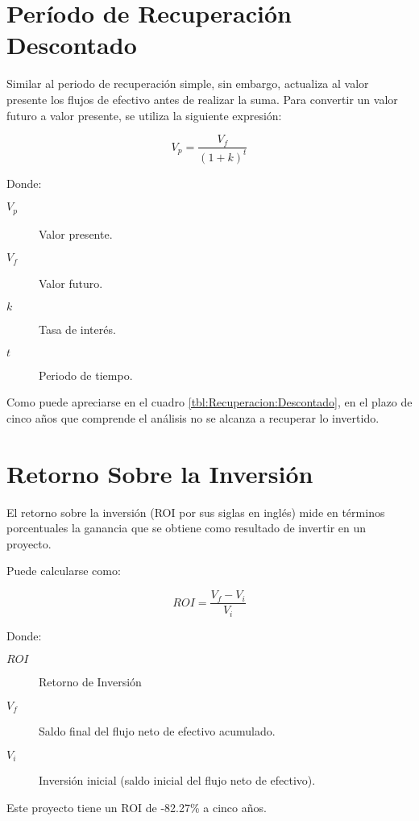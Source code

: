 

\section{Período de Recuperación Descontado}

Similar al periodo de recuperación simple, sin embargo, actualiza al valor presente los flujos de efectivo antes de realizar la suma. Para convertir un valor futuro a valor presente, se utiliza la siguiente expresión:

$$V_p = \frac{V_f}{\left(1+k\right)^t}$$

Donde:

\begin{description}
	\item[$V_p$] Valor presente.
	\item[$V_f$] Valor futuro.
	\item[$k$] Tasa de interés.
	\item[$t$] Periodo de tiempo.
\end{description}

Como puede apreciarse en el cuadro \ref{tbl:Recuperacion:Descontado}, en el plazo de cinco años que comprende el análisis no se alcanza a recuperar lo invertido.



\section{Retorno Sobre la Inversión}

El retorno sobre la inversión (ROI por sus siglas en inglés) mide en términos porcentuales la ganancia que se obtiene como resultado de invertir en un proyecto.

Puede calcularse como:

$$ROI = \frac{V_f - V_i}{V_i}$$

Donde:

\begin{description}
	\item[$ROI$] Retorno de Inversión
	\item[$V_f$] Saldo final del flujo neto de efectivo acumulado.
	\item[$V_i$] Inversión inicial (saldo inicial del flujo neto de efectivo).
\end{description}

Este proyecto tiene un ROI de -82.27\% a cinco años.

